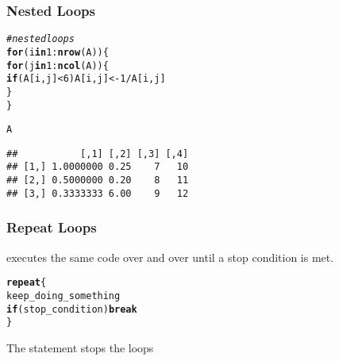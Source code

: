 \documentclass[12pt]{beamer}\usepackage[]{graphicx}\usepackage[]{color}
\makeatletter
\newcommand{\hlnum}[1]{\textcolor[rgb]{0.686,0.059,0.569}{#1}}%
\newcommand{\hlcom}[1]{\textcolor[rgb]{0.678,0.584,0.686}{\textit{#1}}}%
\newcommand{\hlopt}[1]{\textcolor[rgb]{0,0,0}{#1}}%
\newcommand{\hlstd}[1]{\textcolor[rgb]{0.345,0.345,0.345}{#1}}%
\newcommand{\hlkwa}[1]{\textcolor[rgb]{0.161,0.373,0.58}{\textbf{#1}}}%
\newcommand{\hlkwb}[1]{\textcolor[rgb]{0.69,0.353,0.396}{#1}}%
\newcommand{\hlkwd}[1]{\textcolor[rgb]{0.737,0.353,0.396}{\textbf{#1}}}%
\newenvironment{kframe}{%
 \def\at@end@of@kframe{}%
 \ifinner\ifhmode%
  \def\at@end@of@kframe{\end{minipage}}%
  \begin{minipage}{\columnwidth}%
 \fi\fi%
 \def\FrameCommand##1{\hskip\@totalleftmargin \hskip-\fboxsep
 \colorbox{shadecolor}{##1}\hskip-\fboxsep
     \hskip-\linewidth \hskip-\@totalleftmargin \hskip\columnwidth}%
 \MakeFramed {\advance\hsize-\width
   \@totalleftmargin\z@ \linewidth\hsize
   \@setminipage}}%
 {\par\unskip\endMakeFramed%
 \at@end@of@kframe}
\newenvironment{knitrout}{}{} %
\makeatother
\begin{document}
\begin{frame}[fragile]
\frametitle{Nested Loops}
\begin{knitrout}\footnotesize
{}\color{fgcolor}\begin{kframe}
\begin{alltt}
\hlcom{# nested loops}
\hlkwa{for} \hlstd{(i} \hlkwa{in} \hlnum{1}\hlopt{:}\hlkwd{nrow}\hlstd{(A)) \{}
  \hlkwa{for} \hlstd{(j} \hlkwa{in} \hlnum{1}\hlopt{:}\hlkwd{ncol}\hlstd{(A)) \{}
    \hlkwa{if} \hlstd{(A[i,j]} \hlopt{<} \hlnum{6}\hlstd{) A[i,j]} \hlkwb{<-} \hlnum{1} \hlopt{/} \hlstd{A[i,j]}
  \hlstd{\}}
\hlstd{\}}

\hlstd{A}
\end{alltt}
\begin{verbatim}
##           [,1] [,2] [,3] [,4]
## [1,] 1.0000000 0.25    7   10
## [2,] 0.5000000 0.20    8   11
## [3,] 0.3333333 6.00    9   12
\end{verbatim}
\end{kframe}
\end{knitrout}

\end{frame}


\begin{frame}
\begin{center}
\Huge{}
\end{center}
\end{frame}


\begin{frame}[fragile]
\frametitle{Repeat Loops}

 executes the same code over and over until a stop condition is met.

\begin{knitrout}\footnotesize
{}\color{fgcolor}\begin{kframe}
\begin{alltt}
\hlkwa{repeat} \hlstd{\{}
  \hlstd{keep_doing_something}
  \hlkwa{if} \hlstd{(stop_condition)} \hlkwa{break}
\hlstd{\}}
\end{alltt}
\end{kframe}
\end{knitrout}

The  statement stops the loops

\end{frame}
\end{document}
